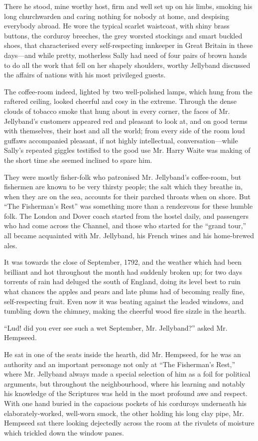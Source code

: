 \documentclass[paper=a5,BCOR=7mm,twoside,DIV=calc,12pt,usegeometry,chapterprefix,endperiod,headings=big]{scrbook}
\begin{document}
There he stood, mine worthy host, firm and well set up on his limbs, smoking his long churchwarden and caring nothing for nobody at home, and despising everybody abroad. He wore the typical scarlet waistcoat, with shiny brass buttons, the corduroy breeches, the grey worsted stockings and smart buckled shoes, that characterised every self-respecting innkeeper in Great Britain in these days---and while pretty, motherless Sally had need of four pairs of brown hands to do all the work that fell on her shapely shoulders, worthy Jellyband discussed the affairs of nations with his most privileged guests.

The coffee-room indeed, lighted by two well-polished lamps, which hung from the raftered ceiling, looked cheerful and cosy in the extreme. Through the dense clouds of tobacco smoke that hung about in every corner, the faces of Mr. Jellyband's customers appeared red and pleasant to look at, and on good terms with themselves, their host and all the world; from every side of the room loud guffaws accompanied pleasant, if not highly intellectual, conversation---while Sally's repeated giggles testified to the good use Mr. Harry Waite was making of the short time she seemed inclined to spare him.

They were mostly fisher-folk who patronised Mr. Jellyband's coffee-room, but fishermen are known to be very thirsty people; the salt which they breathe in, when they are on the sea, accounts for their parched throats when on shore. But \enquote{The Fisherman's Rest} was something more than a rendezvous for these humble folk. The London and Dover coach started from the hostel daily, and passengers who had come across the Channel, and those who started for the \enquote{grand tour,} all became acquainted with Mr. Jellyband, his French wines and his home-brewed ales.

It was towards the close of September, 1792, and the weather which had been brilliant and hot throughout the month had suddenly broken up; for two days torrents of rain had deluged the south of England, doing its level best to ruin what chances the apples and pears and late plums had of becoming really fine, self-respecting fruit. Even now it was beating against the leaded windows, and tumbling down the chimney, making the cheerful wood fire sizzle in the hearth.

\enquote{Lud! did you ever see such a wet September, Mr. Jellyband?} asked Mr. Hempseed.

He sat in one of the seats inside the hearth, did Mr. Hempseed, for he was an authority and an important personage not only at \enquote{The Fisherman's Rest,} where Mr. Jellyband always made a special selection of him as a foil for political arguments, but throughout the neighbourhood, where his learning and notably his knowledge of the Scriptures was held in the most profound awe and respect. With one hand buried in the capacious pockets of his corduroys underneath his elaborately-worked, well-worn smock, the other holding his long clay pipe, Mr. Hempseed sat there looking dejectedly across the room at the rivulets of moisture which trickled down the window panes.
\end{document}
